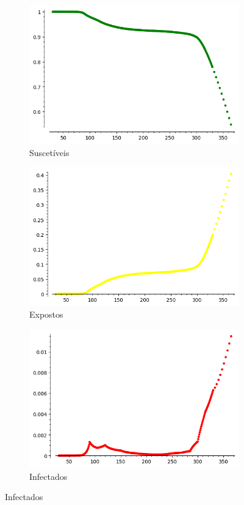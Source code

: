 \documentclass{article}
\begin{document}
\begin{figure}[H]
    \begin{subfigure}{.33\textwidth}
        \centering
        \includegraphics[width = .8\linewidth]{Imagens/S.png}
        \caption{Suscetíveis}
        \label{fig:S}
    \end{subfigure}
    \begin{subfigure}{.33\textwidth}
        \centering
        \includegraphics[width = .8\linewidth]{Imagens/E.png}
        \caption{Expostos}
        \label{fig:E}
    \end{subfigure}
    \begin{subfigure}{.33\textwidth}
        \centering
        \includegraphics[width = .8\linewidth]{Imagens/I.png}
        \caption{Infectados}
        \label{fig:I}
    \end{subfigure}
    

\end{figure}
\end{document}
